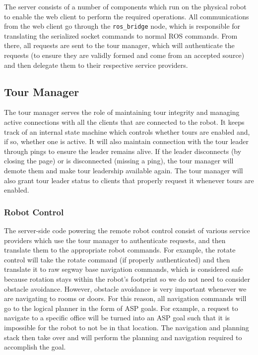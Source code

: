 \documentclass[
  oneside,
  11pt, a4paper,
  footinclude=true,
  headinclude=true,
  cleardoublepage=empty
]{article}
\begin{document}
The server consists of a number of components which run on the physical robot
to enable the web client to perform the required operations. All communications
from the web client go through the \verb|ros_bridge| node, which is responsible
for translating the serialized socket commands to normal ROS commands. From
there, all requests are sent to the tour manager, which will authenticate the
requests (to ensure they are validly formed and come from an accepted source)
and then delegate them to their respective service providers.

\subsection{Tour Manager}

The tour manager serves the role of maintaining tour integrity and managing
active connections with all the clients that are connected to the robot. It
keeps track of an internal state machine which controls whether tours are
enabled and, if so, whether one is active. It will also maintain connection
with the tour leader through pings to ensure the leader remains alive. If the
leader disconnects (by closing the page) or is disconnected (missing a ping),
the tour manager will demote them and make tour leadership available again. The
tour manager will also grant tour leader status to clients that properly
request it whenever tours are enabled.

\subsubsection{Robot Control}

The server-side code powering the remote robot control consist of various
service providers which use the tour manager to authenticate requests, and then
translate them to the appropriate robot commands. For example, the rotate control
will take the rotate command (if properly authenticated) and then translate it
to raw segway base navigation commands, which is considered safe because
rotation stays within the robot's footprint so we do not need to consider
obstacle avoidance. However, obstacle avoidance is very important whenever we
are navigating to rooms or doors. For this reason, all navigation commands will
go to the logical planner in the form of ASP goals. For example, a request to
navigate to a specific office will be turned into an ASP goal such that it is
impossible for the robot to not be in that location. The navigation and
planning stack then take over and will perform the planning and navigation
required to accomplish the goal.
\end{document}
